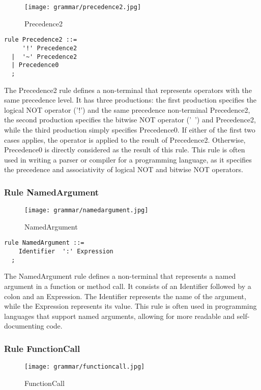 \begin{figure}[!ht]
\centering
\texttt{[image: grammar/precedence2.jpg]}
\caption{Precedence2}
\end{figure}

\begin{lstlisting}
rule Precedence2 ::=
     '!' Precedence2 
  |  '~' Precedence2 
  | Precedence0 
  ;
\end{lstlisting}

The Precedence2 rule defines a non-terminal that represents operators with the same precedence level. It has three productions: the first production specifies the logical NOT operator ('!') and the same precedence non-terminal Precedence2, the second production specifies the bitwise NOT operator ('~') and Precedence2, while the third production simply specifies Precedence0. If either of the first two cases applies, the operator is applied to the result of Precedence2. Otherwise, Precedence0 is directly considered as the result of this rule. This rule is often used in writing a parser or compiler for a programming language, as it specifies the precedence and associativity of logical NOT and bitwise NOT operators.
\subsubsection*{Rule NamedArgument}

\begin{figure}[!ht]
\centering
\texttt{[image: grammar/namedargument.jpg]}
\caption{NamedArgument}
\end{figure}

\begin{lstlisting}
rule NamedArgument ::=
    Identifier  ':' Expression 
  ;
\end{lstlisting}

The NamedArgument rule defines a non-terminal that represents a named argument in a function or method call. It consists of an Identifier followed by a colon and an Expression. The Identifier represents the name of the argument, while the Expression represents its value. This rule is often used in programming languages that support named arguments, allowing for more readable and self-documenting code.

\subsubsection*{Rule FunctionCall}

\begin{figure}[!ht]
\centering
\texttt{[image: grammar/functioncall.jpg]}
\caption{FunctionCall}
\end{figure}

